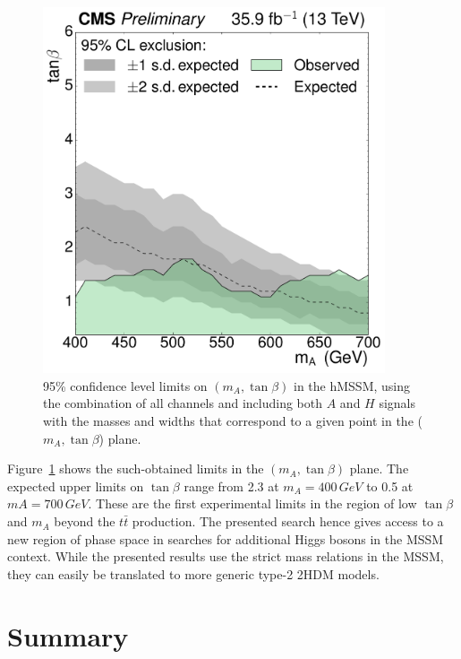 \begin{figure}[!Hhtb]
\centering
\includegraphics[width=0.9\textwidth,keepaspectratio=true]{fig/chapt8/limits/hmssm_exclusion.pdf}
\caption{95\% confidence level limits on $(m_A, \tan\beta)$ in the hMSSM, using the combination of all channels and including both $A$ and $H$ signals with the masses and widths that correspond to a given point in the ($m_A, \tan\beta$) plane.}
\label{fig:limits_hmssm}
\end{figure}

Figure~\ref{fig:limits_hmssm} shows the such-obtained limits in the $(m_A, \tan\beta)$ plane.
The expected upper limits on $\tan\beta$ range from 2.3 at $m_A = 400\,GeV$ to 0.5 at $mA = 700\,GeV$.
These are the first experimental limits in the region of low $\tan\beta$ and $m_A$ beyond the $t\bar t$ production.
The presented search hence gives access to a new region of phase space in searches for additional Higgs bosons in the MSSM context.
While the presented results use the strict mass relations in the MSSM, they can easily be translated to more generic type-2 2HDM models.

\section{Summary}


